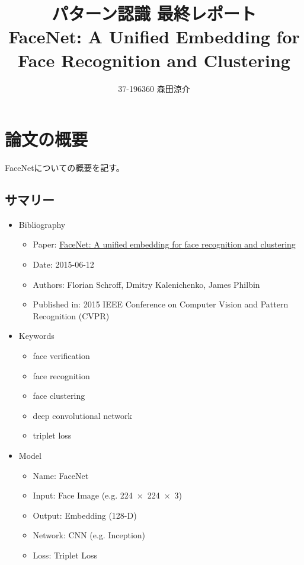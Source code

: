 \documentclass[dvipdfmx, fleqn]{jsarticle}
\title{
    パターン認識 最終レポート \\
    FaceNet: A Unified Embedding for Face Recognition and Clustering
    }
\author{37-196360 \quad 森田涼介}
\begin{document}
\maketitle

\section{論文の概要}

FaceNet\cite{schroff2015facenet}についての概要を記す。


\subsection{サマリー}

\begin{itemize}
    \item Bibliography
    \begin{itemize}
        \item Paper: \href{https://ieeexplore.ieee.org/document/7298682}{FaceNet: A unified embedding for face recognition and clustering}
        \item Date: 2015-06-12
        \item Authors: Florian Schroff, Dmitry Kalenichenko, James Philbin
        \item Published in: 2015 IEEE Conference on Computer Vision and Pattern Recognition (CVPR)
    \end{itemize}
    \item Keywords
    \begin{itemize}
        \item face verification
        \item face recognition
        \item face clustering
        \item deep convolutional network
        \item triplet loss
    \end{itemize}
    \item Model
    \begin{itemize}
        \item Name: FaceNet
        \item Input: Face Image (e.g. \num{224 x 224 x 3})
        \item Output: Embedding (128-D)
        \item Network: CNN (e.g. Inception)
        \item Loss: Triplet Loss
    \end{itemize}

\end{itemize}
\end{document}
